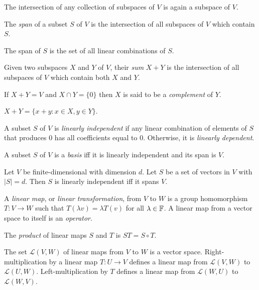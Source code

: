 \begin{prop}
  The intersection of any collection of subspaces of $V$ is again a subspace of
  $V$.
\end{prop}
\begin{defn}
  The \emph{span} of a subset $S$ of $V$ is the intersection of all subspaces of
  $V$ which contain $S$.
\end{defn}
\begin{prop}
  The span of $S$ is the set of all linear combinations of $S$.
\end{prop}
\begin{defn}
  Given two subspaces $X$ and $Y$ of $V$, their \emph{sum} $X+Y$ is the
  intersection of all subspaces of $V$ which contain both $X$ and $Y$.

  If $X+Y=V$ and $X\cap Y=\{0\}$ then $X$ is said to be a \emph{complement} of
  $Y$.
\end{defn}
\begin{prop}
  $X+Y=\{x+y:x\in X,y\in Y\}$.
\end{prop}
\begin{defn}
  A subset $S$ of $V$ is \emph{linearly independent} if any linear combination
  of elements of $S$ that produces $ 0$ has all coefficients equal to $0$.
  Otherwise, it is \emph{linearly dependent}.
\end{defn}
\begin{prop}
  A subset $S$ of $V$ is a \emph{basis} iff it is linearly independent and its
  span is $V$.
\end{prop}
\begin{prop}
  Let $V$ be finite-dimensional with dimension $d$.
  Let $S$ be a set of vectors in $V$ with $|S|=d$. Then $S$ is linearly
  independent iff it spans $V$.
\end{prop}
\begin{defn}
  A \emph{linear map}, or \emph{linear transformation}, from $V$ to $W$ is a group homomorphism
  $T:V\to W$ such that $T(\lambda v)=\lambda T(v)$ for all $\lambda\in\mathbb{F}$. A
  linear map from a vector space to itself is an \emph{operator}.

  The \emph{product} of linear maps $S$ and $T$ is $ST=S\circ T$.
\end{defn}
\begin{prop}
  The set $\mathcal L(V,W)$ of linear maps from $V$ to $W$ is a vector space.
  Right-multiplication by a linear map $T:U\to V$ defines a linear map from $\mathcal
  L(V,W)$ to $\mathcal L(U,W)$. Left-multiplication by $T$ defines a linear map
  from $\mathcal L(W,U)$ to $\mathcal L(W,V)$.
\end{prop}
